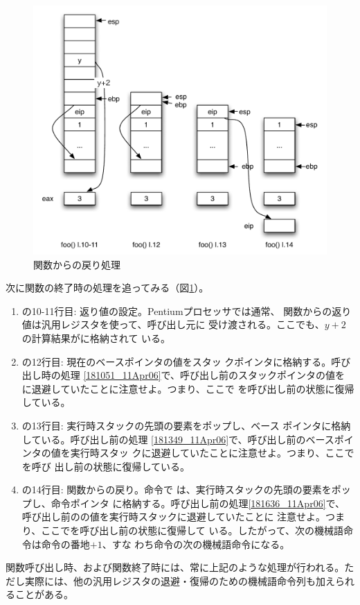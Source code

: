 \begin{figure}
 \begin{center}
  \includegraphics[width=12cm]{figure/function_return.pdf}
 \end{center} 
 \caption{関数からの戻り処理}
 \label{191124_11Apr06}
\end{figure}

次に関数の終了時の処理を追ってみる（図\ref{191124_11Apr06}）。

\begin{enumerate}
 \item {}の10-11行目: 返り値の設定。Pentiumプロセッサでは通常、
       関数からの返り値は汎用レジスタを使って、呼び出し元に
       受け渡される。ここでも、$y+2$の計算結果がに格納されて
       いる。
 \item {}の12行目: 現在のベースポインタの値をスタッ
       クポインタに格納する。呼び出し時の処理
       \ref{181051_11Apr06}で、呼び出し前のスタックポインタの値を
       に退避していたことに注意せよ。つまり、ここで
       を呼び出し前の状態に復帰している。
 \item {}の13行目: 実行時スタックの先頭の要素をポップし、ベース
       ポインタに格納している。呼び出し前の処理
       \ref{181349_11Apr06}で、呼び出し前のベースポインタの値を実行時スタッ
       クに退避していたことに注意せよ。つまり、ここでを呼び
       出し前の状態に復帰している。
 \item {}の14行目: 関数からの戻り。命令で
       は、実行時スタックの先頭の要素をポップし、命令ポインタ
       に格納する。呼び出し前の処理\ref{181636_11Apr06}で、
       呼び出し前のの値を実行時スタックに退避していたことに
       注意せよ。つまり、ここでを呼び出し前の状態に復帰して
       いる。したがって、次の機械語命令は命令の番地$+1$、すな
       わち命令の次の機械語命令になる。
\end{enumerate}

関数呼び出し時、および関数終了時には、常に上記のような処理が行われる。た
だし実際には、他の汎用レジスタの退避・復帰のための機械語命令列も加えられ
ることがある。
